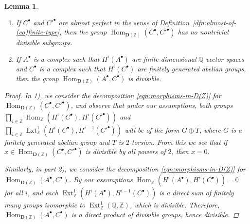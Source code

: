 \documentclass{article}
\DeclareMathOperator{\Ext}{Ext}
\DeclareMathOperator{\Hom}{Hom}
\newcommand{\QQ}{\mathbb{Q}}
\newcommand{\ZZ}{\mathbb{Z}}
\newtheorem{lemma}[theorem]{Lemma}
\theoremstyle{definition}
\numberwithin{equation}{section}
\begin{document}
\begin{appendices}
\begin{lemma}
  \label{lemma:morphisms-inDAb-not-divisible}
  ~

  \begin{enumerate}
  \item[1)] If $C^\bullet$ and $C'^\bullet$ are almost perfect in the sense of
    Definition~\ref{dfn:almost-of-(co)finite-type}, then the group
    $\Hom_{\mathbf{D} (\ZZ)} (C^\bullet, C'^\bullet)$ has no nontrivial
    divisible subgroups.

  \item[2)] If $A^\bullet$ is a complex such that $H^i (A^\bullet)$ are finite
    dimensional $\QQ$-vector spaces and $C^\bullet$ is a complex such that
    $H^i (C^\bullet)$ are finitely generated abelian groups, then the group
    $\Hom_{\mathbf{D} (\ZZ)} (A^\bullet, C^\bullet)$ is divisible.
  \end{enumerate}

  \begin{proof}
    In 1), we consider the decomposition \eqref{eqn:morphisms-in-D(Z)} for
    $\Hom_{\mathbf{D} (\ZZ)} (C^\bullet, C'^\bullet)$, and observe that under
    our assumptions, both groups
    $\prod_{i\in\ZZ} \Hom_\ZZ (H^i (C^\bullet), H^i (C'^\bullet))$ and
    $\prod_{i\in\ZZ} \Ext_\ZZ^1 (H^i (C^\bullet), H^{i-1} (C'^\bullet))$ will be of
    the form $G \oplus T$, where $G$ is a finitely generated abelian group and
    $T$ is $2$-torsion. From this we see that if
    $x \in \Hom_{\mathbf{D} (\ZZ)} (C^\bullet, C'^\bullet)$ is divisible by all
    powers of $2$, then $x = 0$.

    Similarly, in part 2), we consider the decomposition
    \eqref{eqn:morphisms-in-D(Z)} for
    $\Hom_{\mathbf{D} (\ZZ)} (A^\bullet, C^\bullet)$. By our assumptions
    $\Hom_\ZZ (H^i (A^\bullet), H^i (C^\bullet)) = 0$ for all $i$, and each
    $\Ext_\ZZ^1 (H^i (A^\bullet), H^{i-1} (C^\bullet))$ is a direct sum of
    finitely many groups isomorphic to $\Ext_\ZZ^1 (\QQ,\ZZ)$, which is
    divisible. Therefore, $\Hom_{\mathbf{D} (\ZZ)} (A^\bullet, C^\bullet)$ is
    a direct product of divisible groups, hence divisible.
  \end{proof}
\end{lemma}


\end{appendices}
\end{document}
